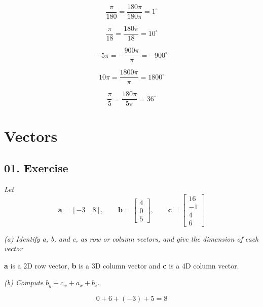 \documentclass[12pt, a4paper]{article}
\begin{document}
\begin{equation}
	\tag{f}
	\frac{\pi}{180} = \frac{180\pi}{180\pi} = 1^\circ
\end{equation}

\begin{equation}
	\tag{g}
	\frac{\pi}{18} = \frac{180\pi}{18} = 10^\circ
\end{equation}

\begin{equation}
	\tag{h}
	-5\pi = -\frac{900\pi}{\pi} = -900^\circ
\end{equation}

\begin{equation}
	\tag{i}
	10\pi = \frac{1800\pi}{\pi} = 1800^\circ
\end{equation}

\begin{equation}
	\tag{j}
	\frac{\pi}{5} = \frac{180\pi}{5\pi} = 36^\circ 
\end{equation}

\newpage\quad


\section*{Vectors}

\subsection*{01. Exercise}

\qquad\textit{Let}
\begin{equation}
		\tag*{}
		\mathbf{a} = \left[-3\quad8\right], \qquad			
		\mathbf{b} =
		\begin{bmatrix}
		4\\0\\5
		\end{bmatrix}, \qquad		
		\mathbf{c} =
		\begin{bmatrix}
		16\\-1\\4\\6
		\end{bmatrix}
\end{equation}

\textit{(a) Identify a, b, and c, as row or column vectors, and give the dimension
of each vector} \\

	\begin{center}
		\textbf{a} is a 2D row vector, \textbf{b} is a 3D column vector 		and \textbf{c} is a 4D column vector. \\
	\end{center}

\textit{(b) Compute $b_y + c_w + a_x + b_z$.}

	\begin{equation}
		\tag*{}
		0 + 6 + (-3) + 5 = 8
	\end{equation}
\end{document}
